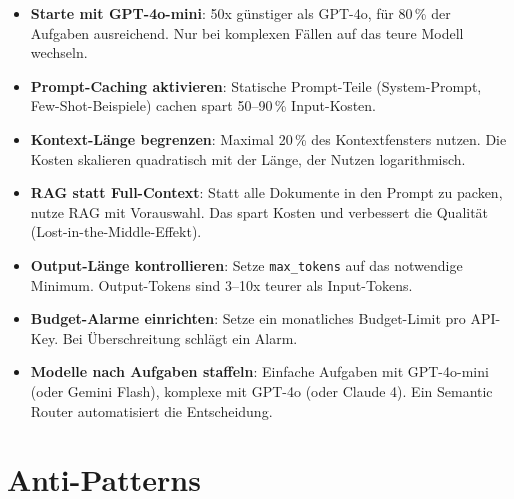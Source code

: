 \begin{itemize}[leftmargin=*]
    \item \textbf{Starte mit GPT-4o-mini}: 50x günstiger als GPT-4o,
    für 80\,\% der Aufgaben ausreichend. Nur bei komplexen Fällen
    auf das teure Modell wechseln.
    \item \textbf{Prompt-Caching aktivieren}: Statische Prompt-Teile
    (System-Prompt, Few-Shot-Beispiele) cachen spart 50--90\,\%
    Input-Kosten.
    \item \textbf{Kontext-Länge begrenzen}: Maximal 20\,\% des
    Kontextfensters nutzen. Die Kosten skalieren quadratisch mit der
    Länge, der Nutzen logarithmisch.
    \item \textbf{RAG statt Full-Context}: Statt alle Dokumente in den
    Prompt zu packen, nutze RAG mit Vorauswahl. Das spart Kosten und
    verbessert die Qualität (Lost-in-the-Middle-Effekt).
    \item \textbf{Output-Länge kontrollieren}: Setze \texttt{max\_tokens}
    auf das notwendige Minimum. Output-Tokens sind 3--10x teurer als
    Input-Tokens.
    \item \textbf{Budget-Alarme einrichten}: Setze ein monatliches
    Budget-Limit pro API-Key. Bei Überschreitung schlägt ein Alarm.
    \item \textbf{Modelle nach Aufgaben staffeln}: Einfache Aufgaben
    mit GPT-4o-mini (oder Gemini Flash), komplexe mit GPT-4o (oder
    Claude 4). Ein Semantic Router automatisiert die Entscheidung.
\end{itemize}

\section{Anti-Patterns}

